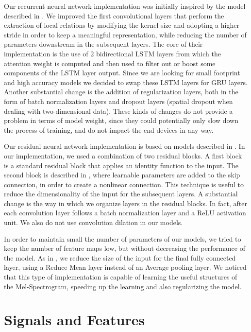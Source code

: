 Our recurrent neural network implementation was initially inspired by the model described in \cite{1}. 
We improved the first convolutional layers that perform the extraction of local relations by modifying the kernel size and adopting a higher stride in order to keep a meaningful representation, while reducing the number of parameters downstream in the subsequent layers. The core of their implementation is the use of 2 bidirectional LSTM layers from which the attention weight is computed and then used to filter out or boost some components of the LSTM layer output.
Since we are looking for small footprint and high accuracy models we decided to swap these LSTM layers for GRU layers.
Another substantial change is the addition of regularization layers, both in the form of batch normalization layers and dropout layers (spatial dropout when dealing with two-dimensional data). These kinds of changes do not provide a problem in terms of model weight, since they could potentially only slow down the process of training, and do not impact the end devices in any way.


Our residual neural network implementation is based on models described in \cite{2}.
In our implementation, we used a combination of two residual blocks. A first block is a standard residual block that applies an identity function to the input. The second block is described in \cite{14}, where learnable parameters are added to the skip connection, in order to create a nonlinear connection. This technique is useful to reduce the dimensionality of the input for the subsequent layers.
A substantial change is the way in which we organize layers in the residual blocks. In fact, after each convolution layer follows a batch normalization layer and a ReLU activation unit. We also do not use convolution dilation in our models.


In order to maintain small the number of parameters of our models, we tried to keep the number of feature maps low, but without decreasing the performance of the model.
As in \cite{2}, we reduce the size of the input for the final fully connected layer, using a Reduce Mean layer instead of an Average pooling layer.
We noticed that this type of implementation is capable of learning the useful structures of the Mel-Spectrogram, speeding up the learning and also regularizing the model.

\section{Signals and Features}
\label{sec:model}

